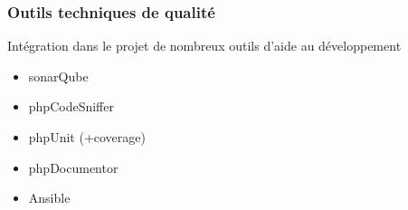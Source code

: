 \speaker{\Matthieu}

\begin{frame}
\frametitle{Outils techniques de qualité}
\begin{block}{Intégration dans le projet de nombreux outils d'aide au développement}
	\begin{itemize}
		\item sonarQube
		\item phpCodeSniffer %
		\item phpUnit (+coverage) %
		\item phpDocumentor
		\item Ansible
	\end{itemize}
\end{block}
\end{frame}

